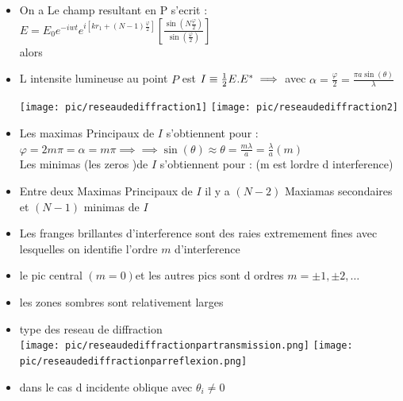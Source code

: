\documentclass[12pt]{book}
\begin{document}
\begin{itemize}
                \item On a Le champ resultant en P s'ecrit : $E = E_0e^{-iwt}e^{i[kr_1+(N-1)\frac{\varphi}{2}]}\left[ \frac{\sin(N\frac{\varphi}{2})}{\sin(\frac{\varphi}{2})} \right]$ \\
                    alors 
                \item L intensite lumineuse au point $P$ est $I \equiv \frac{1}{2}E.E^{*} \\ \implies $ avec $\alpha = \frac{\varphi}{2}=\frac{\pi a \sin(\theta)}{\lambda} $
                    \begin{center}
                        \texttt{[image: pic/reseaudediffraction1]}
                        \texttt{[image: pic/reseaudediffraction2]}
                    \end{center}
                \item Les maximas Principaux de $I$ s'obtiennent pour :\\
                    $\varphi = 2m\pi=\alpha=m\pi\implies $$ \implies \sin(\theta) \approx \theta =\frac{m\lambda}{a}=\frac{\lambda}{a}(m)$\\
                    Les minimas (les zeros )de $I$ s'obtiennent pour :  (m est lordre d interference)
                \item Entre deux Maximas Principaux de $I$ il y a $(N-2)$ Maxiamas secondaires et $(N-1)$ minimas de $I$
                \item Les franges brillantes d'interference sont des raies extremement fines avec lesquelles on identifie l'ordre $m$ d'interference
                \item le pic central $(m=0) $et les autres pics sont d ordres $ m = \pm 1, \pm 2 ,\ldots$
                \item les zones sombres sont relativement larges 
                \item type des reseau de diffraction \\
                    \texttt{[image: pic/reseaudediffractionpartransmission.png]}
                    \texttt{[image: pic/reseaudediffractionparreflexion.png]}
                \item \begin{minipage}{0.49\linewidth}
                    dans le cas d incidente oblique  avec $\theta_i \not = 0$

\end{minipage}
\end{itemize}
\end{document}

